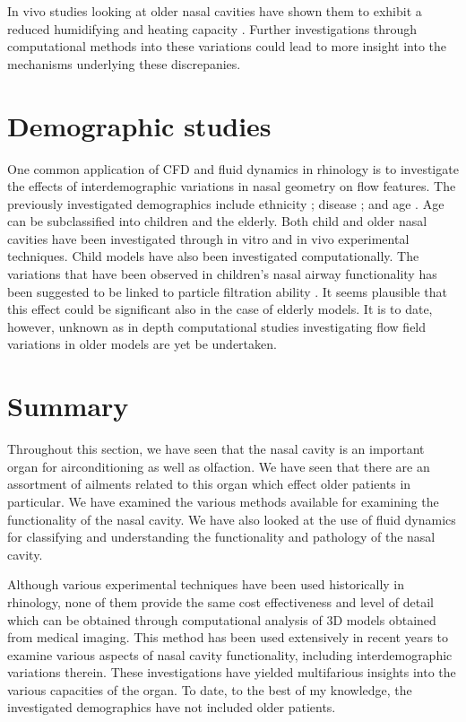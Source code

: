 In vivo studies looking at older nasal cavities have shown them to exhibit a reduced humidifying and heating capacity \cite{Lindemann2008}. Further investigations through computational methods into these variations could lead to more insight into the mechanisms underlying these discrepanies.

\section{Demographic studies}
One common application of CFD and fluid dynamics in rhinology is to investigate the effects of interdemographic variations in nasal geometry on flow features. The previously investigated demographics include ethnicity \cite{Zhu2011}; disease \cite{Garcia2007}; and  age \cite{Xi2012}. Age can be subclassified into children \cite{Xi2012} and the elderly\cite{Lindemann2008}. Both child and older nasal cavities have been investigated through in vitro\cite{Weinhold2004} and in vivo\cite{Kalmovich2005, Edelstein1996, WhanKim2007, Lindemann2008} experimental techniques. Child models have also been investigated computationally\cite{Xi2012}. The variations that have been observed in children's nasal airway functionality has been suggested to be linked to particle filtration ability \cite{Xi2012}. It seems plausible that this effect could be significant also in the case of elderly models. It is to date, however, unknown as in depth computational studies investigating flow field variations in older models are yet be undertaken.


\section{Summary}

Throughout this section, we have seen that the nasal cavity is an important organ for airconditioning as well as olfaction. We have seen that there are an assortment of ailments related to this organ which effect older patients in particular. We have examined the various methods available for examining the functionality of the nasal cavity. We have also looked at the use of fluid dynamics for classifying and understanding the functionality and pathology of the nasal cavity.

Although various experimental techniques have been used historically in rhinology, none of them provide the same cost effectiveness and level of detail which can be obtained through computational analysis of 3D models obtained from medical imaging. This method has been used extensively in recent years to examine various aspects of nasal cavity functionality, including interdemographic variations therein. These investigations have yielded multifarious insights into the various capacities of the organ. To date, to the best of my knowledge, the investigated demographics have not included older patients.

